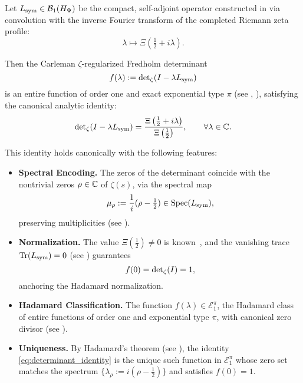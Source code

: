 \begin{theorem}
\label{thm:det_identity_revised}
\leavevmode
\begin{tcolorbox}[colback=gray!3!white,colframe=black!75!white,title={\textbf{Canonical Determinant Identity}}]
Let \( L_{\mathrm{sym}} \in \mathcal{B}_1(H_{\Psi}) \) be the compact, self-adjoint operator constructed in  via convolution with the inverse Fourier transform of the completed Riemann zeta profile:
\[
\lambda \mapsto \Xi\left( \tfrac{1}{2} + i\lambda \right).
\]

\medskip

Then the Carleman \(\zeta\)-regularized Fredholm determinant
\[
f(\lambda) := \det\nolimits_{\zeta}(I - \lambda L_{\mathrm{sym}})
\]
is an entire function of order one and exact exponential type \( \pi \) (see , ), satisfying the canonical analytic identity:
\begin{equation}
\det\nolimits_{\zeta}(I - \lambda L_{\mathrm{sym}})
= \frac{\Xi\left( \tfrac{1}{2} + i\lambda \right)}{\Xi\left( \tfrac{1}{2} \right)},
\qquad \forall \lambda \in \mathbb{C}.
\label{eq:determinant_identity}
\end{equation}

\medskip

This identity holds canonically with the following features:

\begin{itemize}
  \item \textbf{Spectral Encoding.} The zeros of the determinant coincide with the nontrivial zeros \( \rho \in \mathbb{C} \) of \( \zeta(s) \), via the spectral map
  \[
  \mu_\rho := \frac{1}{i}(\rho - \tfrac{1}{2}) \in \operatorname{Spec}(L_{\mathrm{sym}}),
  \]
  preserving multiplicities (see ).

  \item \textbf{Normalization.} The value \( \Xi(\tfrac{1}{2}) \ne 0 \) is known~\cite[Thm.~2.3]{Titchmarsh1986Zeta}, and the vanishing trace \(\operatorname{Tr}(L_{\mathrm{sym}}) = 0\) (see ) guarantees
  \[
  f(0) = \det\nolimits_{\zeta}(I) = 1,
  \]
  anchoring the Hadamard normalization.

  \item \textbf{Hadamard Classification.} The function \( f(\lambda) \in \mathcal{E}_1^\pi \), the Hadamard class of entire functions of order one and exponential type \( \pi \), with canonical zero divisor (see ).

  \item \textbf{Uniqueness.} By Hadamard’s theorem (see ), the identity \eqref{eq:determinant_identity} is the unique such function in \( \mathcal{E}_1^\pi \) whose zero set matches the spectrum \( \{ \lambda_\rho := i(\rho - \tfrac{1}{2}) \} \) and satisfies \( f(0) = 1 \).
\end{itemize}


\end{tcolorbox}
\end{theorem}
